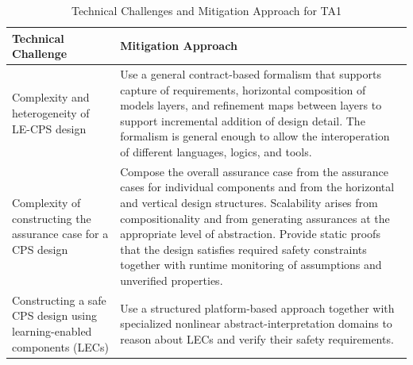 \begin{table}[h!]
\caption{Technical Challenges and Mitigation Approach for TA1}
  \centering
  
{\footnotesize
\begin{tabular}{|m{2.1in}|m{4.05in}|} 
\hline
\textbf{Technical Challenge} & \textbf{Mitigation Approach} 
\\\hline
Complexity and heterogeneity of LE-CPS design & 
Use a general contract-based formalism that supports capture of
requirements, horizontal composition of models layers, and refinement
maps between layers to support incremental addition of design detail.
The formalism is general enough to allow the interoperation of
different languages, logics, and tools. \\ \hline

Complexity of constructing the assurance case for a CPS design & 
Compose the overall assurance case from the assurance cases for
individual components and from the horizontal and vertical
design structures.  Scalability arises from compositionality and
from generating assurances at the appropriate level of abstraction.
Provide static proofs that the design satisfies required safety
constraints together with runtime monitoring of assumptions and
unverified  properties.\\ \hline

Constructing a safe CPS design using learning-enabled components
(LECs) &
Use a structured platform-based approach together with specialized nonlinear
abstract-interpretation domains to reason about LECs and verify their
safety requirements. \\

\cline{1-2}

\hline
\end{tabular}
}
\end{table}


